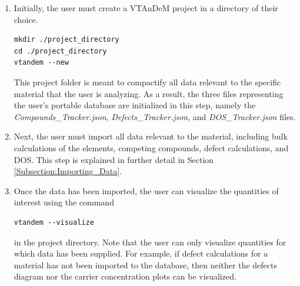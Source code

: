 \documentclass[%
 reprint,
 amsmath,amssymb,
 aps,
]{revtex4-1}
\begin{document}
\begin{enumerate}

\item Initially, the user must create a VTAnDeM project in a directory of their choice.
\begin{verbatim}
mkdir ./project_directory
cd ./project_directory
vtandem --new
\end{verbatim}
This project folder is meant to compactify all data relevant to the specific material that the user is analyzing. As a result, the three files representing the user's portable database are initialized in this step, namely the \textit{Compounds\_Tracker.json}, \textit{Defects\_Tracker.json}, and \textit{DOS\_Tracker.json} files.

\item Next, the user must import all data relevant to the material, including bulk calculations of the elements, competing compounds, defect calculations, and DOS. This step is explained in further detail in Section \ref{Subsection:Importing_Data}.

\item Once the data has been imported, the user can visualize the quantities of interest using the command
\begin{verbatim}
vtandem --visualize
\end{verbatim}
in the project directory. Note that the user can only visualize quantities for which data has been supplied. For example, if defect calculations for a material has not been imported to the database, then neither the defects diagram nor the carrier concentration plots can be visualized.

\end{enumerate}


\end{document}
